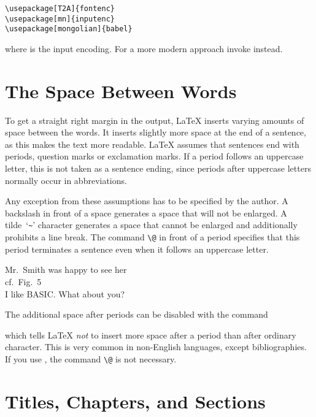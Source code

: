 \begin{lscommand}
\verb|\usepackage[T2A]{fontenc}|\\
\verb|\usepackage[mn]{inputenc}|\\
\verb|\usepackage[mongolian]{babel}|
\end{lscommand}

\noindent where  is the  input encoding. For a more modern approach
invoke  instead.

\section{The Space Between Words}

To get a straight right margin in the output, \LaTeX{} inserts varying
amounts of space between the words. It inserts slightly more space at
the end of a sentence, as this makes the text more readable.  \LaTeX{}
assumes that sentences end with periods, question marks or exclamation
marks. If a period follows an uppercase letter, this is not taken as a
sentence ending, since periods after uppercase letters normally occur in
abbreviations.

Any exception from these assumptions has to be specified by the
author. A backslash in front of a space generates a space that will
not be enlarged. A tilde~`\verb|~|' character generates a space that cannot be
enlarged and additionally prohibits a line break. The command
\verb|\@| in front of a period specifies that this period terminates a
sentence even when it follows an uppercase letter.
  

\begin{example}
Mr.~Smith was happy to see her\\
cf.~Fig.~5\\
I like BASIC\@. What about you?
\end{example}

The additional space after periods can be disabled with the command
\begin{lscommand}
\end{lscommand}
\noindent which tells \LaTeX{} \emph{not} to insert more space after a
period than after ordinary character. This is very common in
non-English languages, except bibliographies. If you use
, the command \verb|\@| is not necessary.

\section{Titles, Chapters, and Sections}


